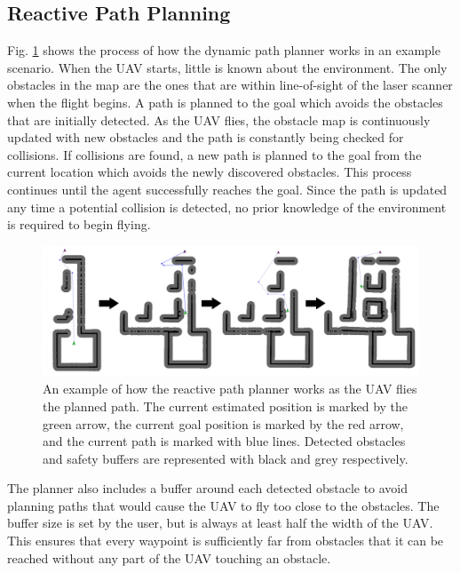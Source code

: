 \documentclass[letterpaper, 10 pt, conference]{ieeeconf}  %
\begin{document}
\subsection{Reactive Path Planning}

Fig. \ref{fig:reactive_plan} shows the process of how the dynamic path planner works in an example scenario. When the UAV starts, little is known about the environment. The only obstacles in the map are the ones that are within line-of-sight of the laser scanner when the flight begins. A path is planned to the goal which avoids the obstacles that are initially detected. As the UAV flies, the obstacle map is continuously updated with new obstacles and the path is constantly being checked for collisions. If collisions are found, a new path is planned to the goal from the current location which avoids the newly discovered obstacles. This process continues until the agent successfully reaches the goal. Since the path is updated any time a potential collision is detected, no prior knowledge of the environment is required to begin flying.

\begin{figure}
\centering
\includegraphics[width=1.0\linewidth]{adaptive_path_plan2.png}
\caption{An example of how the reactive path planner works as the UAV flies the planned path. The current estimated position is marked by the green arrow, the current goal position is marked by the red arrow, and the current path is marked with blue lines. Detected obstacles and safety buffers are represented with black and grey respectively.}
\label{fig:reactive_plan}
\end{figure}

The planner also includes a buffer around each detected obstacle to avoid planning paths that would cause the UAV to fly too close to the obstacles. The buffer size is set by the user, but is always at least half the width of the UAV. This ensures that every waypoint is sufficiently far from obstacles that it can be reached without any part of the UAV touching an obstacle.
\end{document}

